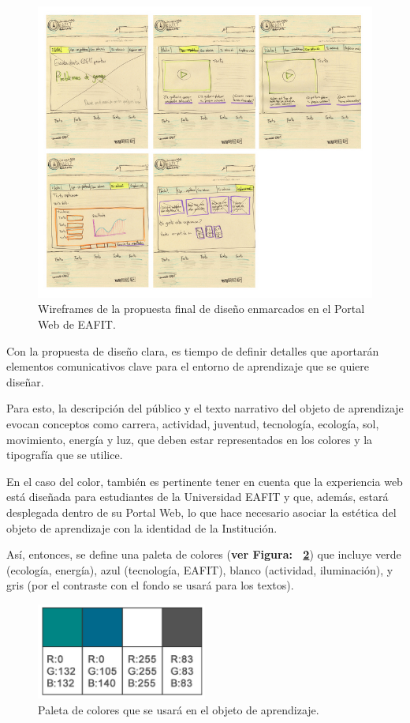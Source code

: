 \documentclass[twoside,letterpaper,11pt]{report}
\begin{document}
\begin{figure}[h!]
\label{wireframes}
\includegraphics[width=1\textwidth]{aux/wireframes}
\caption{Wireframes de la propuesta final de diseño enmarcados en el Portal Web de EAFIT.}
\end{figure}


Con la propuesta de diseño clara, es tiempo de definir detalles que aportarán elementos comunicativos clave para el entorno de aprendizaje que se quiere diseñar.

Para esto, la descripción del público y el texto narrativo del objeto de aprendizaje evocan conceptos como carrera, actividad, juventud, tecnología, ecología, sol, movimiento, energía y luz, que deben estar representados en los colores y la tipografía que se utilice.

En el caso del color, también es pertinente tener en cuenta que la experiencia web está diseñada para estudiantes de la Universidad EAFIT y que, además, estará desplegada dentro de su Portal Web, lo que hace necesario asociar la estética del objeto de aprendizaje con la identidad de la Institución.

Así, entonces, se define una paleta de colores (\textbf{ver Figura: ~\ref{paleta}}) que incluye verde (ecología, energía), azul (tecnología, EAFIT), blanco (actividad, iluminación), y gris (por el contraste con el fondo se usará para los textos).

\begin{figure}[h!]
\label{paleta}
\centering
\includegraphics[width=0.5\textwidth]{aux/paletaColores}
\caption{Paleta de colores que se usará en el objeto de aprendizaje.}
\end{figure}
\end{document}
